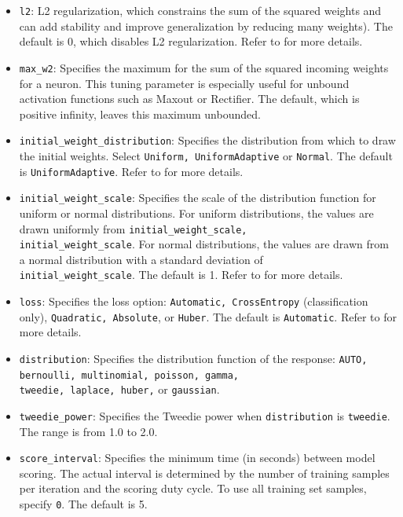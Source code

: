 {{{\begin{itemize}
\item \texttt{l2}: L2 regularization, which constrains the sum of the squared weights and can add stability and improve generalization by reducing many weights). The default is 0, which disables L2 regularization. Refer to {\textbf{}} for more details.

\item \texttt{max\_w2}: Specifies the maximum for the sum of the squared incoming weights for a neuron. This tuning parameter is especially useful for unbound activation functions such as Maxout or Rectifier. The default, which is positive infinity, leaves this maximum unbounded.

\item \texttt{initial\_weight\_distribution}: Specifies the distribution from which to draw the initial weights. Select \texttt{Uniform, UniformAdaptive} or \texttt{Normal}. The default is \texttt{UniformAdaptive}. Refer to {\textbf{}} for more details.

\item \texttt{initial\_weight\_scale}: Specifies the scale of the distribution function for uniform or normal distributions. For uniform distributions, the values are drawn uniformly from \texttt{initial\_weight\_scale, \\ initial\_weight\_scale}. For normal distributions, the values are drawn from a normal distribution with a standard deviation of \\ \texttt{initial\_weight\_scale}. The default is 1. Refer to {\textbf{}} for more details.

\item \texttt{loss}: Specifies the loss option: \texttt{Automatic, CrossEntropy} (classification only), \texttt{Quadratic, Absolute}, or \texttt{Huber}. The default is \texttt{Automatic}. Refer to {\textbf{}} for more details.

\item \texttt{distribution}: Specifies the distribution function of the response: \texttt{AUTO, bernoulli, multinomial, poisson, gamma, \\ tweedie, laplace, huber,} or \texttt{gaussian}. 

\item \texttt{tweedie\_power}: Specifies the Tweedie power when \texttt{distribution} is  \texttt{tweedie}. The range is from 1.0 to 2.0. 

\item \texttt{score\_interval}: Specifies the minimum time (in seconds) between model scoring. The actual interval is determined by the number of training samples per iteration and the scoring duty cycle. To use all training set samples, specify \texttt{0}. The default is 5.


\end{itemize}}}}
